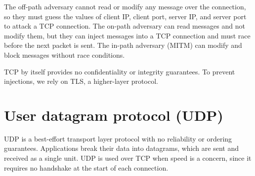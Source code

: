 \medskip
The off-path adversary cannot read or modify any message over the connection, so they must guess the values of client IP, client port, server IP, and server port to attack a TCP connection. The on-path adversary can read messages and not modify them, but they can inject messages into a TCP connection and must race before the next packet is sent. The in-path adversary (MITM) can modify and block messages without race conditions.

\medskip
TCP by itself provides no confidentiality or integrity guarantees. To prevent injections, we rely on TLS, a higher-layer protocol.

\section{User datagram protocol (UDP)}
UDP is a best-effort transport layer protocol with no reliability or ordering guarantees. Applications break their data into datagrams, which are sent and received as a single unit. UDP is used over TCP when speed is a concern, since it requires no handshake at the start of each connection.
